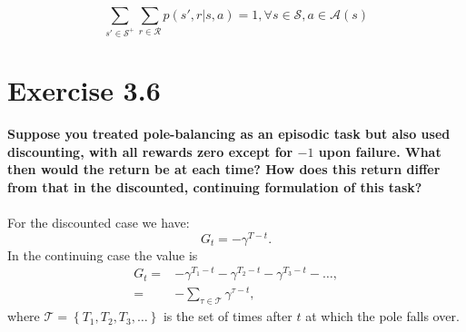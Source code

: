 \documentclass[a4paper,11pt]{article}
\numberwithin{equation}{section}
\theoremstyle{remark}
\begin{document}
\begin{equation*}
\sum_{s'\in \mathcal{S}^+}\sum_{r\in \mathcal{R}}{p(s',r|s,a)=1}, \forall s\in \mathcal{S}, a\in \mathcal{A}(s)
\end{equation*}



\section{Exercise 3.6}
\textbf{
Suppose you treated pole-balancing as an episodic task but also used
discounting, with all rewards zero except for $-1$ upon failure. What then would the
return be at each time? How does this return differ from that in the discounted, continuing
formulation of this task? 
}
\\ \\
For the discounted case we have:
$$
    G_t = - \gamma^{T - t}.
$$
In the continuing case the value is
\begin{align*} 
 G_t =& - \gamma^{T_1-t}-\gamma^{T_2-t}-\gamma^{T_3-t}-\dots, \\ 
     =&  - \sum_{\tau \in \mathcal{T}} \gamma^{\tau - t},
\end{align*}
where $\mathcal{T} = \left\{T_1,T_2,T_3,\dots\right\}$ is the set of times after $t$ at which the pole falls over.
\end{document}

